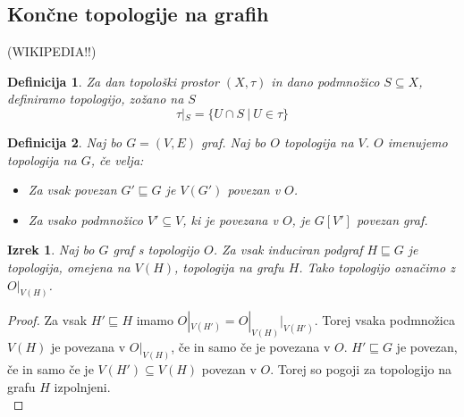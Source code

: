 \documentclass[mat1, tisk]{fmfdelo}
\newtheorem{definition}{Definicija}[subsection]
\newtheorem{theorem}{Izrek}[subsection]
\begin{document}
\subsection{Končne topologije na grafih}
(WIKIPEDIA!!)\\
\begin{definition}
  Za dan topološki prostor $(X, \tau)$ in dano podmnožico $S \subseteq X$, definiramo
  topologijo, zožano na $S$ \[\tau|_S = \{U \cap S\ |\ U \in \tau\}\]
\end{definition}
\begin{definition}
  Naj bo $G = (V,E)$ graf. Naj bo $O$ topologija na $V$. $O$ imenujemo topologija
  na $G$, če velja:
  \begin{itemize}
    \item[(1)] Za vsak povezan $G' \sqsubseteq G$ je $V(G')$ povezan v $O$.
    \item[(2)] Za vsako podmnožico $V' \subseteq V$, ki je povezana v $O$, je $G[V']$ povezan graf.
  \end{itemize}
\end{definition}
\begin{theorem}
  Naj bo $G$ graf s topologijo $O$. Za vsak induciran podgraf $H \sqsubseteq G$ je topologija,
  omejena na $V(H)$, topologija na grafu $H$. Tako topologijo označimo z $O|_{V(H)}$.
\end{theorem}
\begin{proof}
  Za vsak $H' \sqsubseteq H$ imamo $O|_{V(H')} = O|_{V(H)}|_{V(H')}$. Torej vsaka
  podmnožica $V(H)$ je povezana v $O|_{V(H)}$, če in samo če je povezana v $O$.
  $H' \sqsubseteq G$ je povezan, če in samo če je $V(H') \subseteq V(H)$ povezan v $O$.
  Torej so pogoji za topologijo na grafu $H$ izpolnjeni. \\
\end{proof}
\end{document}
